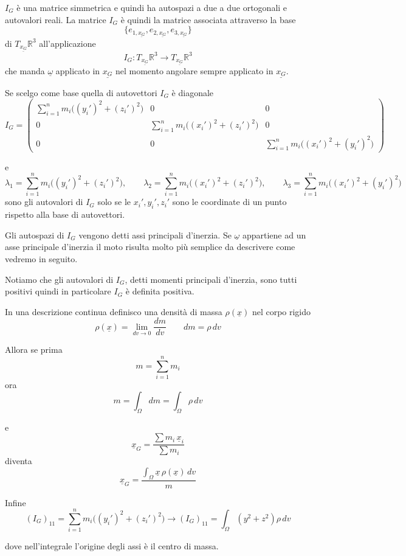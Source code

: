 \begin{oss}{}
\(I_G\) è una matrice simmetrica e quindi ha autospazi a due a due ortogonali e autovalori reali.
La matrice \(I_G\) è quindi la matrice associata attraverso la base
\[
\{e_{1,\underline{x_G}},e_{2,\underline{x_G}},e_{3,\underline{x_G}}\}
\]
di \(T_{\underline{x_G}}\mathbb{R}^3\) all'applicazione
\[
I_G:T_{\underline{x_G}}\mathbb{R}^3\to T_{\underline{x_G}}\mathbb{R}^3
\]
che manda \(\underline{\omega}\) applicato in \(\underline{x_G}\) nel momento angolare sempre applicato in \(\underline{x_G}\).

Se scelgo come base quella di autovettori \(I_G\) è diagonale
\[
I_G=
\left(
\begin{array}{ccc}
\displaystyle \sum_{i=1}^{n} m_i\bigl((y_i')^2+(z_i')^2\bigr) & 0 & 0\\[1em]
0 & \displaystyle \sum_{i=1}^{n} m_i\bigl((x_i')^2+(z_i')^2\bigr) & 0\\[1em]
0 & 0 & \displaystyle \sum_{i=1}^{n} m_i\bigl((x_i')^2+(y_i')^2\bigr)
\end{array}
\right)
\]

e
\[
\lambda_1=\sum_{i=1}^{n} m_i\bigl((y_i')^2+(z_i')^2\bigr),
\qquad
\lambda_2=\sum_{i=1}^{n} m_i\bigl((x_i')^2+(z_i')^2\bigr),
\qquad
\lambda_3=\sum_{i=1}^{n} m_i\bigl((x_i')^2+(y_i')^2\bigr)
\]
sono gli autovalori di \(I_G\) solo se le \(x_i',y_i',z_i'\) sono le coordinate di un punto rispetto alla base di autovettori.

Gli autospazi di \(I_G\) vengono detti assi principali d'inerzia. Se \(\underline{\omega}\) appartiene ad un asse principale d'inerzia il moto risulta molto più semplice da descrivere come vedremo in seguito.

Notiamo che gli autovalori di \(I_G\), detti momenti principali d'inerzia, sono tutti positivi quindi in particolare \(I_G\) è definita positiva.
\end{oss}


\begin{oss}{}
In una descrizione continua definisco una densità di massa \(\rho(\underline{x})\) nel corpo rigido
\[
\rho(\underline{x})=\lim_{dv\to 0}\frac{dm}{dv}
\qquad
dm=\rho\, dv
\]

Allora se prima
\[
m=\sum_{i=1}^{n} m_i
\]
ora
\[
m=\int_{\Omega} dm=\int_{\Omega}\rho\, dv
\]

e
\[
\underline{x}_G=\frac{\sum m_i\,\underline{x}_i}{\sum m_i}
\]
diventa
\[
\underline{x}_G=\frac{\int_{\Omega}\underline{x}\,\rho(\underline{x})\, dv}{m}
\]

Infine
\[
(I_G)_{11}=\sum_{i=1}^{n} m_i\bigl((y_i')^2+(z_i')^2\bigr)
\rightarrow
(I_G)_{11}=\int_{\Omega}(y^2+z^2)\rho\, dv
\]

dove nell'integrale l'origine degli assi è il centro di massa.
\end{oss}

